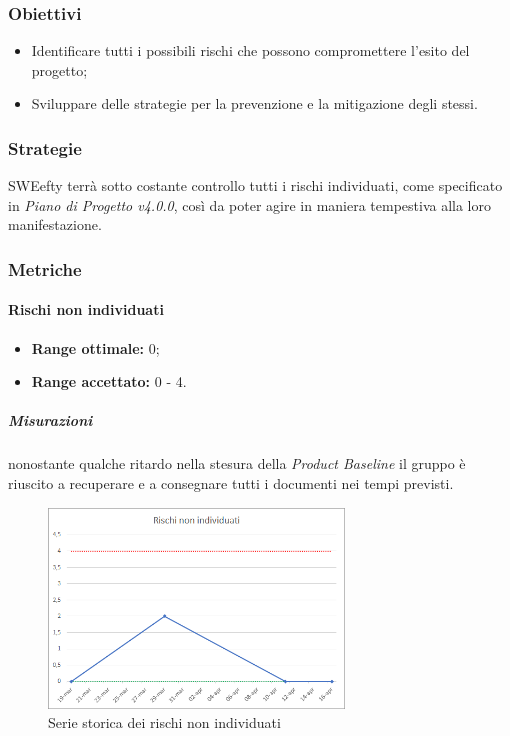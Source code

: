 \subsubsection{Obiettivi}
\begin{itemize}
	\item Identificare tutti i possibili rischi che possono compromettere l'esito del progetto;
	\item Sviluppare delle strategie per la prevenzione e la mitigazione degli stessi.
\end{itemize}
\subsubsection{Strategie}
SWEefty terrà sotto costante controllo tutti i rischi individuati, come specificato in \emph{Piano di Progetto v4.0.0}, così da poter agire in maniera tempestiva alla loro manifestazione.

\subsubsection{Metriche}
\paragraph{Rischi non individuati} \Spazio
	\begin{itemize}
		\item \textbf{Range ottimale: }0;
		\item \textbf{Range accettato: }0 - 4.
	\end{itemize}
    \subparagraph{Misurazioni}
    nonostante qualche ritardo nella stesura della \textit{Product Baseline} il gruppo è riuscito a recuperare e a consegnare tutti i documenti nei tempi previsti. 
    \begin{figure}[H]
    	\centering 
    	\includegraphics[width=0.7\textwidth]{Images/rischiNI.png}
    	\caption{Serie storica dei rischi non individuati}
    	\label{rischi} 
    \end{figure}

